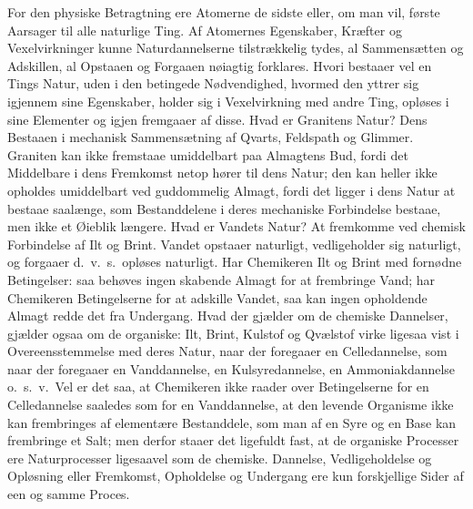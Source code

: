 \documentclass[12pt]{book}
\begin{document}
For den physiske Betragtning ere Atomerne de sidste eller, om man
vil, første Aarsager til alle naturlige Ting. Af Atomernes
Egenskaber, Kræfter og Vexelvirkninger kunne Naturdannelserne
tilstrækkelig tydes, al Sammensætten og Adskillen, al Opstaaen og
Forgaaen nøiagtig forklares. Hvori bestaaer vel en Tings Natur, uden
i den betingede Nødvendighed, hvormed den yttrer sig igjennem sine
Egenskaber, holder sig i Vexelvirkning med andre Ting, opløses i
sine Elementer og igjen fremgaaer af disse. Hvad er Granitens Natur?
Dens Bestaaen i mechanisk Sammensætning af Qvarts, Feldspath og
Glimmer. Graniten kan ikke fremstaae umiddelbart paa Almagtens Bud,
fordi det Middelbare i dens Fremkomst netop hører til dens Natur;
den kan heller ikke opholdes umiddelbart ved guddommelig Almagt,
fordi det ligger i dens Natur
at bestaae saalænge, som Bestanddelene i deres mechaniske
Forbindelse bestaae, men ikke et Øieblik længere. Hvad er Vandets
Natur? At fremkomme ved chemisk Forbindelse af Ilt og Brint. Vandet
opstaaer naturligt, vedligeholder sig naturligt, og forgaaer d.\ v.\
s.\ opløses naturligt. Har Chemikeren Ilt og Brint med fornødne
Betingelser: saa behøves ingen skabende Almagt for at frembringe
Vand; har Chemikeren Betingelserne for at adskille Vandet, saa kan
ingen opholdende Almagt redde det fra Undergang. Hvad der gjælder om
de chemiske Dannelser, gjælder ogsaa om de organiske: Ilt, Brint,
Kulstof og Qvælstof virke ligesaa vist i Overeensstemmelse med deres
Natur, naar der foregaaer en Celledannelse, som naar der foregaaer
en Vanddannelse, en Kulsyredannelse, en Ammoniakdannelse o.\ s.\ v.\
Vel er det saa, at Chemikeren ikke raader over Betingelserne for en
Celledannelse saaledes som for en Vanddannelse, at den levende
Organisme ikke kan frembringes af elementære Bestanddele, som man af
en Syre og en Base kan frembringe et Salt; men derfor staaer det
ligefuldt fast, at de organiske Processer ere Naturprocesser
ligesaavel som de chemiske. Dannelse, Vedligeholdelse og Opløsning
eller Fremkomst, Opholdelse og Undergang ere kun forskjellige Sider
af een og samme Proces.
\end{document}
